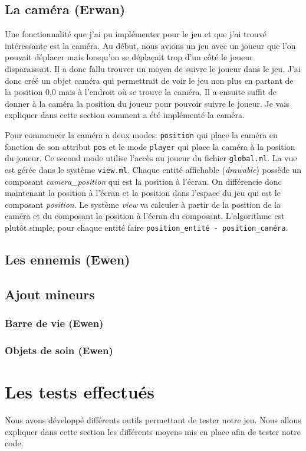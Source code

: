 \documentclass{article}
\begin{document}
\subsection{La caméra (Erwan)}
Une fonctionnalité que j'ai pu implémenter pour le jeu et que j'ai trouvé intéressante est la caméra.
Au début, nous avions un jeu avec un joueur que l'on pouvait déplacer mais lorsqu'on se déplaçait trop 
d'un côté le joueur disparaissait. Il a donc fallu trouver un moyen de suivre le joueur dans le jeu.
J'ai donc créé un objet caméra qui permettrait de voir le jeu non plus en partant de la position 0,0 
mais à l'endroit où se trouve la caméra. Il a ensuite suffit de donner à la caméra la position du joueur 
pour pouvoir suivre le joueur. Je vais expliquer dans cette section comment a été implémenté la caméra.

Pour commencer la caméra a deux modes: \verb|position| qui place la caméra en fonction de son attribut 
\verb|pos| et le mode \verb|player| qui place la caméra à la position du joueur. Ce second mode utilise 
l'accès au joueur du fichier \verb|global.ml|. La vue est gérée dans le système \verb|view.ml|. Chaque 
entité affichable (\textit{drawable}) possède un composant \textit{camera\_position} qui est la position 
à l'écran. On différencie donc maintenant la position à l'écran et la position dans l'espace du jeu qui 
est le composant \textit{position}. Le système \textit{view} va calculer à partir de la position de la 
caméra et du composant la position à l'écran du composant. L'algorithme est plutôt simple, pour chaque 
entité faire \verb|position_entité - position_caméra|. 

\subsection{Les ennemis (Ewen)}

\subsection{Ajout mineurs}
\subsubsection{Barre de vie (Ewen)}
\subsubsection{Objets de soin (Ewen)}

\section{Les tests effectués}
Nous avons développé différents outils permettant de tester notre jeu. Nous allons expliquer dans cette
section les différents moyens mis en place afin de tester notre code. 
\end{document}
